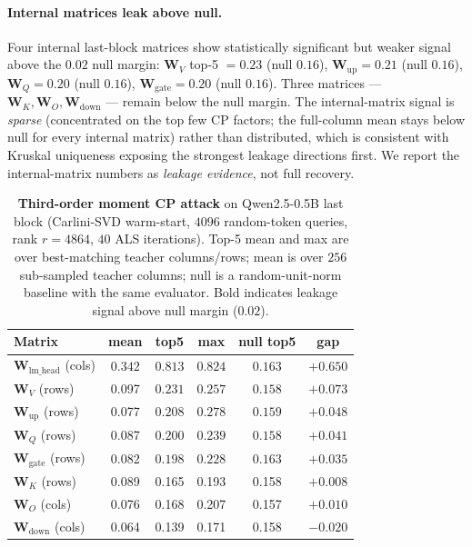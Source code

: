 \documentclass{article}
\newcommand{\bW}{\mathbf{W}}
\begin{document}
\paragraph{Internal matrices leak above null.} Four internal last-block matrices show statistically significant but weaker signal above the $0.02$ null margin: $\bW_V$ top-5 $= 0.23$ (null $0.16$), $\bW_\text{up} = 0.21$ (null $0.16$), $\bW_Q = 0.20$ (null $0.16$), $\bW_\text{gate} = 0.20$ (null $0.16$). Three matrices --- $\bW_K, \bW_O, \bW_\text{down}$ --- remain below the null margin. The internal-matrix signal is \emph{sparse} (concentrated on the top few CP factors; the full-column mean stays below null for every internal matrix) rather than distributed, which is consistent with Kruskal uniqueness exposing the strongest leakage directions first. We report the internal-matrix numbers as \emph{leakage evidence}, not full recovery.

\begin{table}[t]
\centering
\caption{\textbf{Third-order moment CP attack} on Qwen2.5-0.5B last block (Carlini-SVD warm-start, $4096$ random-token queries, rank $r = 4864$, $40$ ALS iterations). Top-5 mean and max are over best-matching teacher columns/rows; mean is over $256$ sub-sampled teacher columns; null is a random-unit-norm baseline with the same evaluator. Bold indicates leakage signal above null margin ($0.02$).}
\label{tab:moments-cp}
\small
\begin{tabular}{@{}l cccc c@{}}
\toprule
\textbf{Matrix} & \textbf{mean} & \textbf{top5} & \textbf{max} & \textbf{null top5} & \textbf{gap} \\
\midrule
$\bW_{\text{lm\_head}}$ (cols) & $\mathbf{0.342}$ & $\mathbf{0.813}$ & $\mathbf{0.824}$ & $0.163$ & $\mathbf{+0.650}$ \\
\midrule
$\bW_V$ (rows) & 0.097 & $\mathbf{0.231}$ & $\mathbf{0.257}$ & $0.158$ & $\mathbf{+0.073}$ \\
$\bW_\text{up}$ (rows) & 0.077 & $\mathbf{0.208}$ & $\mathbf{0.278}$ & $0.159$ & $\mathbf{+0.048}$ \\
$\bW_Q$ (rows) & 0.087 & $\mathbf{0.200}$ & $0.239$ & $0.158$ & $\mathbf{+0.041}$ \\
$\bW_\text{gate}$ (rows) & 0.082 & $\mathbf{0.198}$ & $0.228$ & $0.163$ & $\mathbf{+0.035}$ \\
\midrule
$\bW_K$ (rows) & 0.089 & 0.165 & 0.193 & 0.158 & $+0.008$ \\
$\bW_O$ (cols) & 0.076 & 0.168 & 0.207 & 0.157 & $+0.010$ \\
$\bW_\text{down}$ (cols) & 0.064 & 0.139 & 0.171 & 0.158 & $-0.020$ \\
\bottomrule
\end{tabular}
\end{table}
\end{document}
